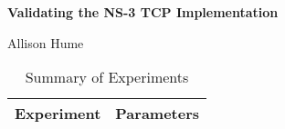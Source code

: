 

\begin{center}

\large{\textbf{Validating the NS-3 TCP Implementation}}

\vskip 5pt

Allison Hume

\end{center}

\vskip 5pt 


\vskip 5pt  

\vskip 5pt  




\begin{table}[h!]
\centering
\begin{tabular}{|l|l|}
\hline
Experiment & Parameters \\ \hline

\hline
\end{tabular}
\caption{Summary of Experiments} 
\label{table:topos}
\end{table}

\cite{SACK}
\cite{NS2WP}
\cite{NS2Val}
\cite{NS2Linux}
\cite{NS3W}
\cite{NS3Val}

\cite{NS2TCPQ}

\cite{LinuxTCP}
\cite{RFC2582}
\cite{RFC6582}

{\small {}
}

